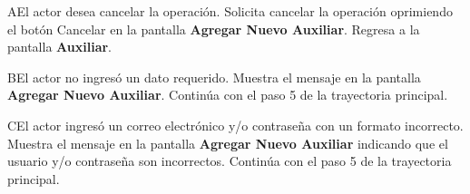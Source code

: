 \begin{UCtrayectoriaA}{A}{El actor desea cancelar la operación.}
	\UCpaso[\UCactor] Solicita cancelar la operación oprimiendo el botón Cancelar en la pantalla \textbf{Agregar Nuevo Auxiliar}.
	\UCpaso Regresa a la pantalla \textbf{Auxiliar}.
\end{UCtrayectoriaA}

\begin{UCtrayectoriaA}{B}{El actor no ingresó un dato requerido.}
	\UCpaso Muestra el mensaje  en la pantalla \textbf{Agregar Nuevo Auxiliar}.
	\UCpaso Continúa con el paso 5 de la trayectoria principal.
\end{UCtrayectoriaA}

\begin{UCtrayectoriaA}{C}{El actor ingresó un correo electrónico y/o contraseña con un formato incorrecto.}
	\UCpaso Muestra el mensaje  en la pantalla \textbf{Agregar Nuevo Auxiliar} indicando que el usuario y/o contraseña son incorrectos.
	\UCpaso Continúa con el paso 5 de la trayectoria principal.
\end{UCtrayectoriaA} 

